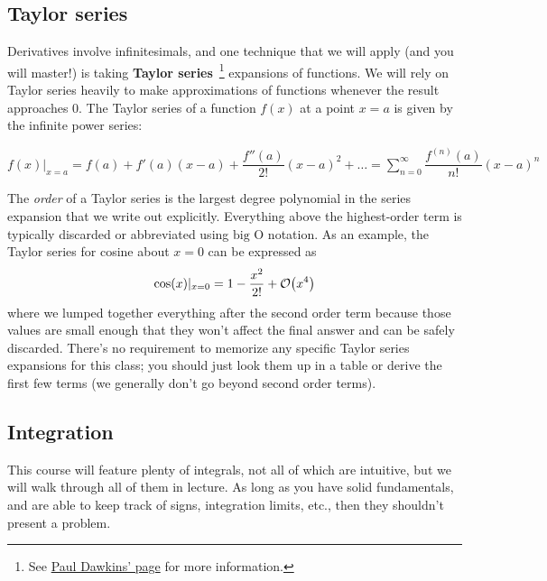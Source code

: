 
\subsection{Taylor series}

Derivatives involve infinitesimals, and one technique that we will apply (and you will master!) is taking \textbf{Taylor series}~\footnote{See \href{http://tutorial.math.lamar.edu/Classes/CalcII/TaylorSeries.aspx}{Paul Dawkins' page} for more information.} expansions of functions. We will rely on Taylor series heavily to make approximations of functions whenever the result approaches 0. The Taylor series of a function $f(x)$ at a point $x=a$ is given by the infinite power series:
\begin{tcolorbox}[title=Taylor series formula]
$f(x)|_{x=a} = f(a) + f'(a)(x-a) + \dfrac{f''(a)}{2!}(x-a)^2 + \dots = \displaystyle\sum_{n=0}^{\infty} \dfrac{f^{(n)}(a)}{n!}(x-a)^n$
\end{tcolorbox}

The \emph{order} of a Taylor series is the largest degree polynomial in the series expansion that we write out explicitly. Everything above the highest-order term is typically discarded or abbreviated using $\text{big O}$ notation. As an example, the Taylor series for cosine about $x=0$ can be expressed as \[ \cos(x)|_{x=0} = 1 - \dfrac{x^2}{2!} + \order{x^4} \] where we lumped together everything after the second order term because those values are small enough that they won't affect the final answer and can be safely discarded. There's no requirement to memorize any specific Taylor series expansions for this class; you should just look them up in a table or derive the first few terms (we generally don't go beyond second order terms).


\subsection{Integration}
This course will feature plenty of integrals, not all of which are intuitive, but we will walk through all of them in lecture. As long as you have solid fundamentals, and are able to keep track of signs, integration limits, etc., then they shouldn't present a problem. \par 

